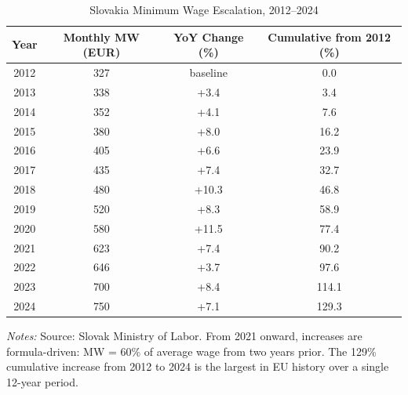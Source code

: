 \begin{table}[h]
\centering
\caption{Slovakia Minimum Wage Escalation, 2012--2024}
\label{tab:mw_escalation}
\footnotesize
\begin{tabular}{cccc}
\hline\hline
Year & Monthly MW (EUR) & YoY Change (\%) & Cumulative from 2012 (\%) \\
\hline
2012 & 327 & baseline & 0.0 \\
2013 & 338 & +3.4 & 3.4 \\
2014 & 352 & +4.1 & 7.6 \\
2015 & 380 & +8.0 & 16.2 \\
2016 & 405 & +6.6 & 23.9 \\
2017 & 435 & +7.4 & 32.7 \\
2018 & 480 & +10.3 & 46.8 \\
2019 & 520 & +8.3 & 58.9 \\
2020 & 580 & +11.5 & 77.4 \\
2021 & 623 & +7.4 & 90.2 \\
2022 & 646 & +3.7 & 97.6 \\
2023 & 700 & +8.4 & 114.1 \\
2024 & 750 & +7.1 & 129.3 \\
\hline\hline
\end{tabular}
\begin{flushleft}
\small \textit{Notes:} Source: Slovak Ministry of Labor. From 2021 onward, increases are formula-driven: MW = 60\% of average wage from two years prior. The 129\% cumulative increase from 2012 to 2024 is the largest in EU history over a single 12-year period.
\end{flushleft}
\end{table}
